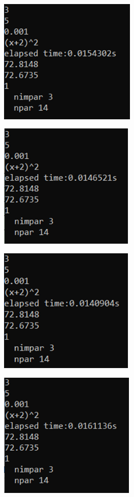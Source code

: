 \documentclass[12pt, letterpaper]{article}
\begin{document}
\begin{figure}[H]
    \begin{subfigure}{0.49\textwidth}
        \includegraphics[width=1\linewidth, height=6cm]{Imagen16}
    \end{subfigure}
    \begin{subfigure}{0.49\textwidth}
        \includegraphics[width=1\linewidth, height=6cm]{Imagen17}
    \end{subfigure}
    \begin{subfigure}{0.49\textwidth}
        \includegraphics[width=1\linewidth, height=6cm]{Imagen18} 
    \end{subfigure}
    \begin{subfigure}{0.49\textwidth}
        \includegraphics[width=1\linewidth, height=6cm]{Imagen19}

\end{subfigure}
\end{figure}
\end{document}
